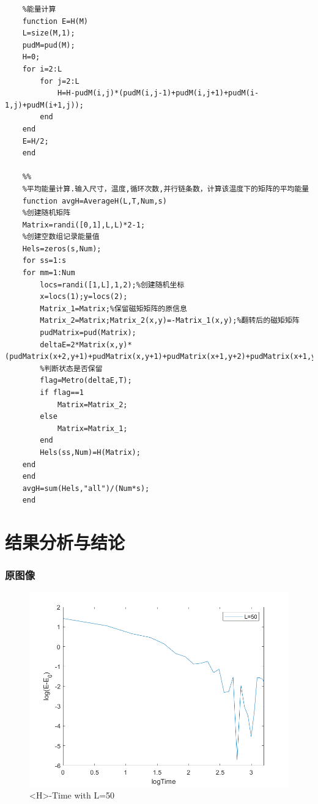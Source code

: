 \documentclass[UTF8,a4paper,10pt]{ctexart}
\begin{document}
\begin{lstlisting}
    %能量计算
    function E=H(M)
    L=size(M,1);
    pudM=pud(M);
    H=0;
    for i=2:L
        for j=2:L
            H=H-pudM(i,j)*(pudM(i,j-1)+pudM(i,j+1)+pudM(i-1,j)+pudM(i+1,j));
        end
    end
    E=H/2;
    end
    
    %%
    %平均能量计算.输入尺寸，温度,循环次数,并行链条数，计算该温度下的矩阵的平均能量
    function avgH=AverageH(L,T,Num,s)
    %创建随机矩阵
    Matrix=randi([0,1],L,L)*2-1;
    %创建空数组记录能量值
    Hels=zeros(s,Num);
    for ss=1:s
    for mm=1:Num
        locs=randi([1,L],1,2);%创建随机坐标
        x=locs(1);y=locs(2);
        Matrix_1=Matrix;%保留磁矩矩阵的原信息
        Matrix_2=Matrix;Matrix_2(x,y)=-Matrix_1(x,y);%翻转后的磁矩矩阵
        pudMatrix=pud(Matrix);
        deltaE=2*Matrix(x,y)*(pudMatrix(x+2,y+1)+pudMatrix(x,y+1)+pudMatrix(x+1,y+2)+pudMatrix(x+1,y));
        %判断状态是否保留
        flag=Metro(deltaE,T);
        if flag==1
            Matrix=Matrix_2;
        else
            Matrix=Matrix_1;
        end
        Hels(ss,Num)=H(Matrix);
    end
    end
    avgH=sum(Hels,"all")/(Num*s);
    end
\end{lstlisting}

\section{结果分析与结论}
\subsubsection{原图像}
\begin{figure}[!htbp]
    \centering
    \includegraphics[width=1\textwidth,height=1\textwidth]{pictures/L50.png}
    \caption{<H>-Time with L=50}
\end{figure}
\end{document}
